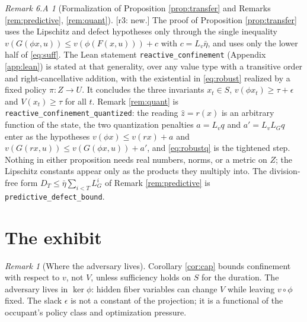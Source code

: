 \documentclass[11pt]{article}
\theoremstyle{definition}
\theoremstyle{remark}
\newtheorem{remark}{Remark}[section]
\newtheorem*{remsixA}{Remark 6.A}
\newcommand{\etabar}{\bar{\eta}}
\newcommand{\revnote}[1]{\textcolor{red!60!black}{[r3: #1]}}
\begin{document}
\begin{remsixA}[Formalization of Proposition \ref{prop:transfer} and Remarks \ref{rem:predictive}, \ref{rem:quant}]
\revnote{new.} The proof of Proposition \ref{prop:transfer} uses the Lipschitz and defect hypotheses only through the single inequality $v(G(\phi x,u))\le v(\phi(F(x,u)))+c$ with $c=L_v\etabar$, and uses only the lower half of \eqref{eq:suff}. The Lean statement \texttt{reactive\_confinement} (Appendix \ref{app:lean}) is stated at that generality, over any value type with a transitive order and right-cancellative addition, with the existential in \eqref{eq:robust} realized by a fixed policy $\pi:Z\to U$. It concludes the three invariants $x_t\in S$, $v(\phi x_t)\ge\tau+\epsilon$ and $V(x_t)\ge\tau$ for all $t$. Remark \ref{rem:quant} is \texttt{reactive\_confinement\_quantized}: the reading $\hat z=r(x)$ is an arbitrary function of the state, the two quantization penalties $a=L_vq$ and $a'=L_vL_Gq$ enter as the hypotheses $v(\phi x)\le v(r x)+a$ and $v(G(r x,u))\le v(G(\phi x,u))+a'$, and \eqref{eq:robustq} is the tightened step. Nothing in either proposition needs real numbers, norms, or a metric on $Z$; the Lipschitz constants appear only as the products they multiply into. The division-free form $D_T\le\etabar\sum_{i<T}L_G^i$ of Remark \ref{rem:predictive} is \texttt{predictive\_defect\_bound}.
\end{remsixA}

\section{The exhibit}\label{sec:exhibit}

\begin{remark}[Where the adversary lives]
Corollary \ref{cor:cap} bounds confinement with respect to $v$, not $V$, unless sufficiency holds on $S$ for the duration. The adversary lives in $\ker\phi$: hidden fiber variables can change $V$ while leaving $v\circ\phi$ fixed. The slack $\epsilon$ is not a constant of the projection; it is a functional of the occupant's policy class and optimization pressure.
\end{remark}
\end{document}
